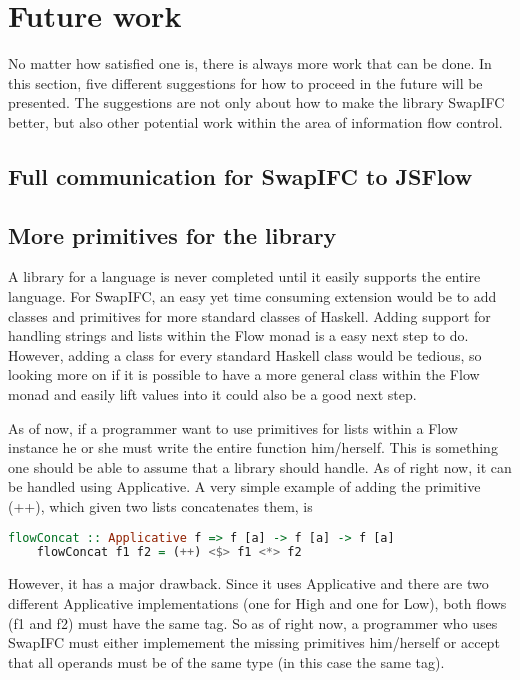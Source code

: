 \section{Future work}
No matter how satisfied one is, there is always more work that can be done. In this section, five different suggestions for how to proceed in the future will be presented. The suggestions are not only about how to make the library SwapIFC better, but also other potential work within the area of information flow control.

\subsection{Full communication for SwapIFC to JSFlow}

\subsection{More primitives for the library}
A library for a language is never completed until it easily supports the entire language. For SwapIFC, an easy yet time consuming extension would be to add classes and primitives for more standard classes of Haskell. Adding support for handling strings and lists within the Flow monad is a easy next step to do. However, adding a class for every standard Haskell class would be tedious, so looking more on if it is possible to have a more general class within the Flow monad and easily lift values into it could also be a good next step.

As of now, if a programmer want to use primitives for lists within a Flow instance he or she must write the entire function him/herself. This is something one should be able to assume that a library should handle. As of right now, it can be handled using Applicative. A very simple example of adding the primitive (++), which given two lists concatenates them, is
\begin{center}
  \begin{lstlisting}[language=Haskell]
    flowConcat :: Applicative f => f [a] -> f [a] -> f [a]
    flowConcat f1 f2 = (++) <$> f1 <*> f2
  \end{lstlisting}
\end{center}
However, it has a major drawback. Since it uses Applicative and there are two different Applicative implementations (one for High and one for Low), both flows (f1 and f2) must have the same tag. So as of right now, a programmer who uses SwapIFC must either implemement the missing primitives him/herself or accept that all operands must be of the same type (in this case the same tag).

